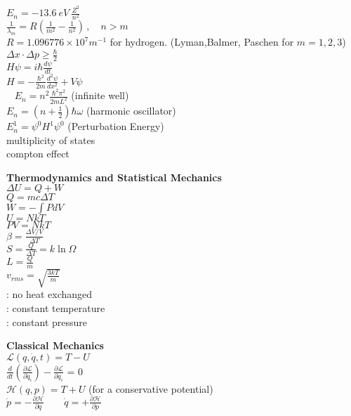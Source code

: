 \documentclass[12pt]{article}
\begin{document}
\begin{twocolumn}
\begin{flushleft}
\medskip
$\displaystyle  E_n = -13.6~eV~\frac{Z^2}{n^2}$ \\
\medskip
$\displaystyle \frac{1}{\lambda_m}=R\left( \frac{1}{m^2} - \frac{1}{n^2}\right) \, , \quad n>m $\\
$R=1.096776\times 10^7 m^{-1}$ for hydrogen. (Lyman,Balmer, Paschen for  $m=1,2,3$)
\medskip
$\displaystyle \Delta x \cdot \Delta  p \geq \frac{\hbar}{2} $ \\
\medskip
$\displaystyle H \psi=i \hbar \frac{d\psi}{dt} $ \\
\medskip
$\displaystyle H=-\frac{\hbar^2}{2m}\frac{d^2 \psi}{dx^2}+V\psi $\\\
\medskip
$\displaystyle E_n=n^2 \frac{\hbar^2 \pi^2}{2mL^2} $  (infinite well)\\ 
\medskip
$\displaystyle E_n=\left(n+\frac{1}{2} \right) \hbar \omega $ (harmonic oscillator)\\ 
\medskip
$\displaystyle E_n^1= \psi^0 H^1 \psi^0 $ (Perturbation Energy)\\
\medskip
multiplicity of states \\
\medskip
compton effect

\newpage
{\bf Thermodynamics and Statistical Mechanics} \\
\bigskip
$\displaystyle \Delta U = Q + W$\\ 
\medskip
$\displaystyle Q=mc\Delta T$\\
\medskip
$W=-\int P dV$\\
\medskip
$U=NkT$\\
\medskip
$PV=NkT$\\
\medskip
$\displaystyle \beta = \frac{\Delta V/V}{\Delta T}$\\
\medskip
$\displaystyle S = \frac{Q}{\Delta T} = k \ln \Omega$\\
\medskip
$\displaystyle L = \frac{Q}{m}$\\
\medskip
$\displaystyle v_{rms} = \sqrt{\frac{3 k T}{m}} $ \\
\medskip
{}: no heat exchanged\\
: constant temperature\\
: constant pressure\\
\bigskip

{\bf Classical Mechanics} \\
\bigskip
$\displaystyle \mathcal{L}(q,\dot{q},t)  = T - U$ \\
\medskip
$\displaystyle \frac{d}{dt}\left(\frac{\partial \mathcal{L}}{\partial \dot{q}_{i}}\right) - \frac{\partial \mathcal{L}}{\partial q_{i}}$ = 0 \\
\medskip
$\displaystyle \mathcal{H}(q,p) = T + U$ (for a conservative potential) \\
\medskip
$\displaystyle \dot{p} = -\frac{\partial \mathcal{H}}{\partial q} \qquad
\dot{q} = +\frac{\partial \mathcal{H}}{\partial p}$
\bigskip


\end{flushleft}
\end{twocolumn}
\end{document}
